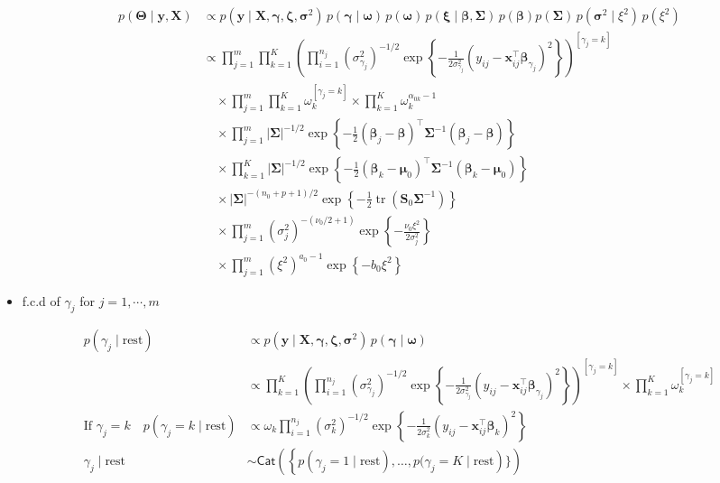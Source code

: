 \begin{appendix}
\begin{itemize}
\begin{equation}
\begin{split}
p(\bm{\Theta} \mid\bm{y}, \bm{X}) 
&\propto p(\bm{y} \mid \bm{X}, \bm{\gamma}, \bm{\zeta}, \bm{\sigma}^2) 
\, p(\bm{\gamma} \mid \bm{\omega}) 
\, p(\bm{\omega}) 
\, p(\bm{\xi} \mid\bm{\beta},\bm{\Sigma}) \, p(\bm{\beta}) 
p(\bm{\Sigma}) 
\, p(\bm{\sigma}^2 \mid \xi^2) 
\, p(\xi^2) \\
&\propto \prod_{j=1}^{m}\prod_{k=1}^{K} \left(\prod_{i=1}^{n_j} (\sigma_{\gamma_j}^2)^{-1/2} 
\exp\left\{ -\frac{1}{2\sigma_{\gamma_j}^2} (y_{ij} - \bm{x}_{ij}^\top \bm{\beta}_{\gamma_j})^2 \right\} \right)^{[\gamma_j = k]}\\
&\quad \times\prod_{j=1}^{m} \prod_{k=1}^{K} \omega_k ^{[\gamma_j = k]}\times\prod_{k=1}^{K}\omega_k^{\alpha_{0k}-1}\\
&\quad \times \prod_{j=1}^{m} |\bm{\Sigma}|^{-1/2} 
\exp\left\{ -\frac{1}{2} (\bm{\beta}_j - \bm{\beta})^\top \bm{\Sigma}^{-1} (\bm{\beta}_j - \bm{\beta}) \right\} \\
&\quad \times \prod_{k=1}^{K} |\bm{\Sigma}|^{-1/2} 
\exp\left\{ -\frac{1}{2} (\bm{\beta}_k - \bm{\mu}_0)^\top \bm{\Sigma}^{-1} (\bm{\beta}_k - \bm{\mu}_0) \right\} \\
&\quad \times |\bm{\Sigma}|^{-(n_0 + p + 1)/2} 
\exp\left\{ -\frac{1}{2} \operatorname{tr}(\bm{S}_0 \bm{\Sigma}^{-1}) \right\} \\
&\quad \times \prod_{j=1}^{m} (\sigma_j^2)^{-\left(\nu_0 / 2 + 1\right)} 
\exp\left\{ -\frac{\nu_0 \xi^2}{2\sigma_j^2} \right\} \\
&\quad \times \prod_{j=1}^{m} (\xi^2)^{a_0 - 1} 
\exp\left\{ -b_0 \xi^2 \right\}
\end{split}
\end{equation}

\item f.c.d of $\gamma_j$ for $j=1,\cdots,m$

\begin{equation}
\begin{split}
p(\gamma_j \mid \text{rest}) 
&\propto p(\bm{y} \mid \bm{X}, \bm{\gamma}, \bm{\zeta}, \bm{\sigma}^2) 
\, p(\bm{\gamma} \mid \bm{\omega}) 
\\
&\propto \prod_{k=1}^{K} \left(\prod_{i=1}^{n_j} (\sigma_{\gamma_j}^2)^{-1/2} 
\exp\left\{ -\frac{1}{2\sigma_{\gamma_j}^2} (y_{ij} - \bm{x}_{ij}^\top \bm{\beta}_{\gamma_j})^2 \right\} \right)^{[\gamma_j = k]} \times \prod_{k=1}^{K} \omega_k^{[{\gamma}_j = k]}\\
\text{If } \gamma_j=k\quad p(\gamma_j = k \mid \text{rest}) 
&\propto \omega_k \prod_{i=1}^{n_j} (\sigma_k^2)^{-1/2} 
\exp\left\{ -\frac{1}{2\sigma_k^2} (y_{ij} - \bm{x}_{ij}^\top \bm{\beta}_k)^2 \right\}\\
\gamma_j\mid \text{rest}&\sim \mathsf{Cat}\left(\left\lbrace p(\gamma_j = 1 \mid \text{rest}),\dots,p(\gamma_j = K \mid \text{rest}\right) \rbrace\right)\\
\end{split}
\end{equation}


\end{itemize}
\end{appendix}
